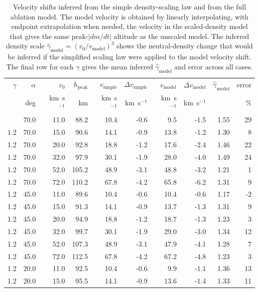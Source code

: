 \begin{table}
\caption{Velocity shifts inferred from the simple density-scaling law and from the full ablation model. The model velocity is obtained by linearly interpolating, with endpoint extrapolation when needed, the velocity in the scaled-density model that gives the same peak-$|dm/dt|$ altitude as the unscaled model. The inferred density scale $\hat{\gamma}_{\mathrm{model}}=(v_0/v_{\mathrm{model}})^3$ shows the neutral-density change that would be inferred if the simplified scaling law were applied to the model velocity shift. The final row for each $\gamma$ gives the mean inferred $\hat{\gamma}_{\mathrm{model}}$ and error across all cases.}
\label{tab:velocity-shift}
\begin{tabular}{rrrrrrrrrr}
\tophline
$\gamma$ & $\alpha$ & $v_0$ & $h_{\mathrm{peak}}$ & $v_{\mathrm{simple}}$ & $\Delta v_{\mathrm{simple}}$ & $v_{\mathrm{model}}$ & $\Delta v_{\mathrm{model}}$ & $\hat{\gamma}_{\mathrm{model}}$ & error \\
 & deg & km~s$^{-1}$ & km & km~s$^{-1}$ & km~s$^{-1}$ & km~s$^{-1}$ & km~s$^{-1}$ &  & \% \\
\middlehline
1.2 & 70.0 & 11.0 & 88.2 & 10.4 & -0.6 & 9.5 & -1.5 & 1.55 & 29 \\
1.2 & 70.0 & 15.0 & 90.6 & 14.1 & -0.9 & 13.8 & -1.2 & 1.30 & 8 \\
1.2 & 70.0 & 20.0 & 92.8 & 18.8 & -1.2 & 17.6 & -2.4 & 1.46 & 22 \\
1.2 & 70.0 & 32.0 & 97.9 & 30.1 & -1.9 & 28.0 & -4.0 & 1.49 & 24 \\
1.2 & 70.0 & 52.0 & 105.2 & 48.9 & -3.1 & 48.8 & -3.2 & 1.21 & 1 \\
1.2 & 70.0 & 72.0 & 110.2 & 67.8 & -4.2 & 65.8 & -6.2 & 1.31 & 9 \\
1.2 & 45.0 & 11.0 & 89.6 & 10.4 & -0.6 & 10.4 & -0.6 & 1.17 & -2 \\
1.2 & 45.0 & 15.0 & 91.3 & 14.1 & -0.9 & 13.7 & -1.3 & 1.31 & 9 \\
1.2 & 45.0 & 20.0 & 94.9 & 18.8 & -1.2 & 18.7 & -1.3 & 1.23 & 3 \\
1.2 & 45.0 & 32.0 & 99.7 & 30.1 & -1.9 & 29.0 & -3.0 & 1.34 & 12 \\
1.2 & 45.0 & 52.0 & 107.3 & 48.9 & -3.1 & 47.9 & -4.1 & 1.28 & 7 \\
1.2 & 45.0 & 72.0 & 112.5 & 67.8 & -4.2 & 67.2 & -4.8 & 1.23 & 3 \\
1.2 & 20.0 & 11.0 & 92.5 & 10.4 & -0.6 & 9.9 & -1.1 & 1.36 & 13 \\
1.2 & 20.0 & 15.0 & 95.5 & 14.1 & -0.9 & 13.6 & -1.4 & 1.33 & 11 \\

\end{tabular}
\end{table}
